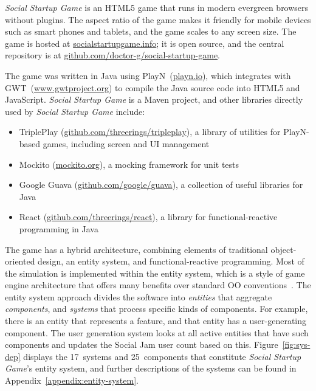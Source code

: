 \documentclass[letterpaper]{article}
\begin{document}
\textit{Social Startup Game} is an HTML5 game that runs
in modern evergreen browsers without plugins. The aspect
ratio of the game makes it friendly for mobile devices such as smart
phones and tablets, and the game scales to any screen size.  The game
is hosted at \url{socialstartupgame.info}; it is open source, and the
central repository is at
\url{github.com/doctor-g/social-startup-game}.

The game was written in Java using PlayN~(\url{playn.io}),
which integrates with GWT~(\url{www.gwtproject.org})
to compile the Java source code into
HTML5 and JavaScript. 
\textit{Social Startup Game} is a Maven project, and other
libraries directly 
used by \textit{Social Startup Game} include: 
\begin{itemize}
\item TriplePlay (\url{github.com/threerings/tripleplay}), 
 a library of utilities for PlayN-based games, including 
 screen and UI management
\item Mockito (\url{mockito.org}), a mocking framework for unit tests
\item Google Guava (\url{github.com/google/guava}), a collection
 of useful libraries for Java
\item React (\url{github.com/threerings/react}), a library for
 functional-reactive programming in Java
\end{itemize}

The game has a hybrid architecture, combining elements of traditional
object-oriented design, an entity system, and functional-reactive
programming.
Most of the simulation is implemented within the entity system,
which is a style of game engine architecture that offers many benefits over
standard OO conventions~\citep{Gestwicki2012,Nystrom2014}. The entity system
approach divides the software into \textit{entities} that
aggregate \textit{components}, and \textit{systems} that process 
specific kinds of components.
For example, there is an entity that represents a feature, and that
entity has a user-generating component. The user generation system
looks at all active entities that have such components and updates
the Social Jam user count based on this.
Figure~\ref{fig:sys-dep} displays the 17~systems
and 25~components that constitute \textit{Social Startup Game}'s
entity system, and further descriptions of the systems can be found
in Appendix~\ref{appendix:entity-system}.
\end{document}
